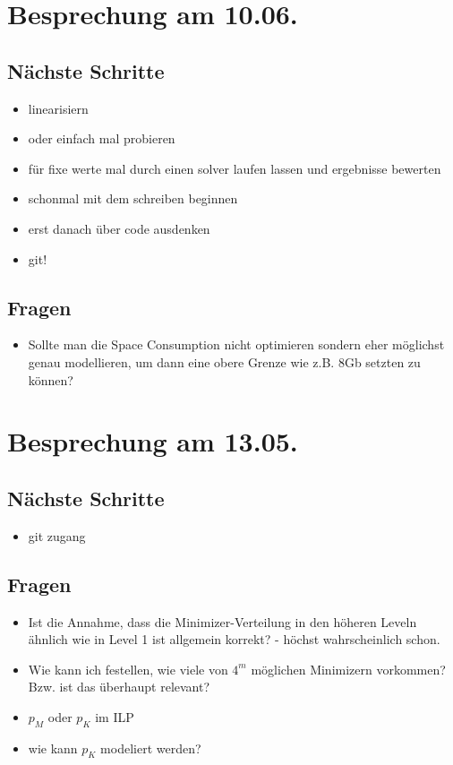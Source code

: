 \documentclass{article}
\begin{document}
\section*{Besprechung am 10.06.}
\subsection*{Nächste Schritte}
	\begin{itemize}
			\item linearisiern
			\item oder einfach mal probieren
			\item für fixe werte mal durch einen solver laufen lassen und ergebnisse bewerten
			\item schonmal mit dem schreiben beginnen
			\item erst danach über code ausdenken
			\item git!
		\end{itemize}
	\subsection*{Fragen}
	\begin{itemize}
			\item Sollte man die Space Consumption nicht optimieren sondern eher möglichst genau modellieren, um dann eine obere Grenze wie z.B. 8Gb setzten zu können?
		\end{itemize}

\section*{Besprechung am 13.05.}
\subsection*{Nächste Schritte}
	\begin{itemize}
			\item git zugang
		\end{itemize}
	\subsection*{Fragen}
	\begin{itemize}
			\item Ist die Annahme, dass die Minimizer-Verteilung in den höheren Leveln ähnlich wie in Level 1 ist allgemein korrekt? - höchst wahrscheinlich schon.
			\item Wie kann ich festellen, wie viele von $4^m$ möglichen Minimizern vorkommen? Bzw. ist das überhaupt relevant?
			\item $p_M$ oder $p_K$ im ILP
			\item wie kann $p_K$ modeliert werden?
		\end{itemize}
\end{document}
